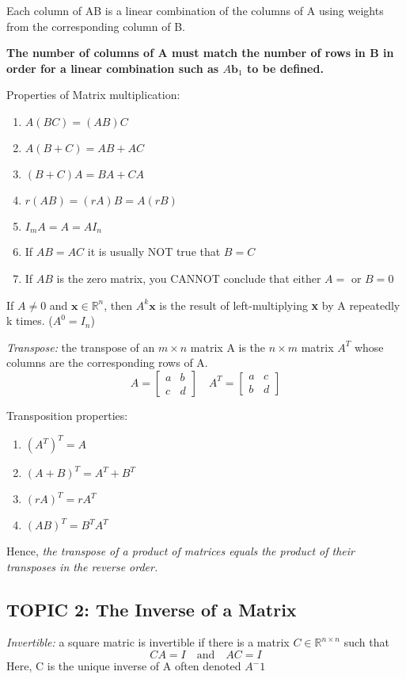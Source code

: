 \documentclass[12pt]{article} %
\newcommand{\R}{\mathbb{R}}
\begin{document}
Each column of AB is a linear combination of the columns of A using weights from the corresponding column of B. 

\textbf{The number of columns of A must match the number of rows in B in order for a linear combination such as $A\mathbf{b}_1$ to be defined.}

Properties of Matrix multiplication:
\begin{enumerate}
	\item $A(BC) = (AB)C$
	\item $A(B + C) = AB + AC$
	\item $(B + C)A = BA + CA$
	\item $r(AB) = (rA)B = A(rB)$
	\item $I_mA = A = AI_n$
	\item If $AB = AC$ it is usually NOT true that $B = C$
	\item If $AB$ is the zero matrix, you CANNOT conclude that either $A = $  or $B = 0$
\end{enumerate}

If $A \neq 0$ and $\mathbf{x} \in \R^n$, then $A^k\mathbf{x}$ is the result of left-multiplying \textbf{x} by A repeatedly k times. ($A^0 = I_n$)

\emph{Transpose:} the transpose of an $m \times n$ matrix A is the $n \times m$ matrix $A^T$ whose columns are the corresponding rows of A.
$$A = \begin{bmatrix}
	a & b\\
	c & d
\end{bmatrix} \quad A^T = \begin{bmatrix}
	a & c\\
	b & d
\end{bmatrix}$$

Transposition properties:
\begin{enumerate}
	\item $(A^T)^T = A$
	\item $(A + B)^T = A^T + B^T$
	\item $(rA)^T = rA^T$
	\item $(AB)^T = B^TA^T$
\end{enumerate}

Hence, \textit{the transpose of a product of matrices equals the product of their transposes in the reverse order.}

\pagebreak
\subsection{TOPIC 2: The Inverse of a Matrix}
\emph{Invertible:} a square matric is invertible if there is a matrix $C \in \R^{n \times n}$ such that 
$$CA = I \quad \text{and} \quad AC = I$$
Here, C is the unique inverse of A often denoted $A^-1$
\end{document}

